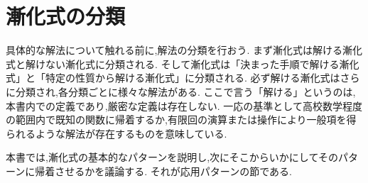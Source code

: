 
\section{漸化式の分類}
具体的な解法について触れる前に,解法の分類を行おう.
まず漸化式は解ける漸化式と解けない漸化式に分類される.
そして漸化式は「決まった手順で解ける漸化式」と「特定の性質から解ける漸化式」に分類される.
必ず解ける漸化式はさらに分類され,各分類ごとに様々な解法がある.
ここで言う「解ける」というのは,本書内での定義であり,厳密な定義は存在しない.
一応の基準として高校数学程度の範囲内で既知の関数に帰着するか,有限回の演算または操作により一般項を得られるような解法が存在するものを意味している.

本書では,漸化式の基本的なパターンを説明し,次にそこからいかにしてそのパターンに帰着させるかを議論する.
それが応用パターンの節である.
